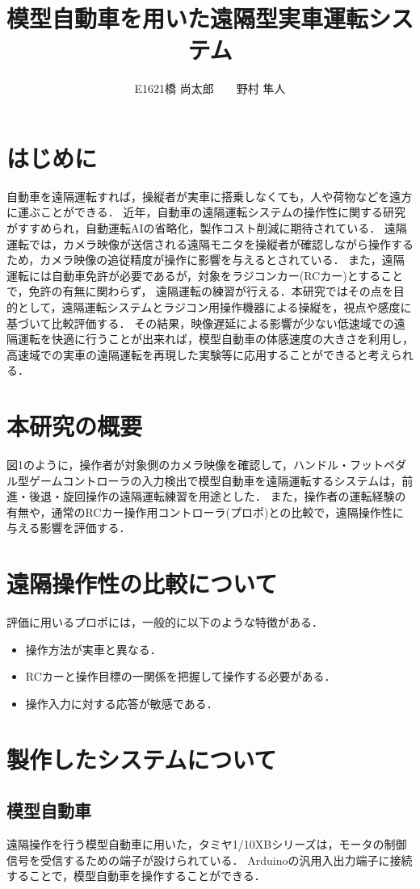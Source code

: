 \documentclass[a4paper,10pt,twocolumn]{jsarticle}
\begin{document}
\title{\textbf{模型自動車を用いた遠隔型実車運転システム}}
\author{E1621橋 尚太郎　　野村 隼人}
\date{}
\maketitle
\section{はじめに}
自動車を遠隔運転すれば，操縦者が実車に搭乗しなくても，人や荷物などを遠方に運ぶことができる．
近年，自動車の遠隔運転システムの操作性に関する研究がすすめられ，自動運転AIの省略化，製作コスト削減に期待されている．
遠隔運転では，カメラ映像が送信される遠隔モニタを操縦者が確認しながら操作するため，カメラ映像の追従精度が操作に影響を与えるとされている．
また，遠隔運転には自動車免許が必要であるが，対象をラジコンカー(RCカー)とすることで，免許の有無に関わらず，
遠隔運転の練習が行える．本研究ではその点を目的として，遠隔運転システムとラジコン用操作機器による操縦を，視点や感度に基づいて比較評価する．
その結果，映像遅延による影響が少ない低速域での遠隔運転を快適に行うことが出来れば，模型自動車の体感速度の大きさを利用し，高速域での実車の遠隔運転を再現した実験等に応用することができると考えられる．
\section{本研究の概要}
図1のように，操作者が対象側のカメラ映像を確認して，ハンドル・フットペダル型ゲームコントローラの入力検出で模型自動車を遠隔運転するシステムは，前進・後退・旋回操作の遠隔運転練習を用途とした．
また，操作者の運転経験の有無や，通常のRCカー操作用コントローラ(プロポ)との比較で，遠隔操作性に与える影響を評価する．
\section{遠隔操作性の比較について}
評価に用いるプロポには，一般的に以下のような特徴がある．
\begin{itemize}
    \item 操作方法が実車と異なる．
    \item RCカーと操作目標の一関係を把握して操作する必要がある．
    \item 操作入力に対する応答が敏感である．
\end{itemize}
\section{製作したシステムについて}
\subsection{模型自動車}
遠隔操作を行う模型自動車に用いた，タミヤ1/10XBシリーズは，モータの制御信号を受信するための端子が設けられている．
Arduinoの汎用入出力端子に接続することで，模型自動車を操作することができる．
\end{document}

